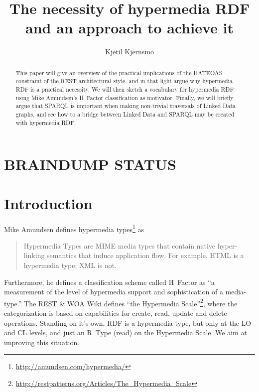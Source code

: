\documentclass{llncs}
\title{The necessity of hypermedia RDF and an approach to achieve it}
\author{Kjetil Kjernsmo\inst{1}}
\institute{Department of Informatics,
Postboks 1080 Blindern,
0316 Oslo, Norway
\email{kjekje@ifi.uio.no}}
\begin{document}
\maketitle



\begin{abstract}
This paper will give an overview of the practical implications of the
HATEOAS constraint of the REST architectural style, and in that light argue why
hypermedia RDF is a practical necessity. We will then sketch a
vocabulary for hypermedia RDF using Mike Amundsen's H~Factor
classification as motivator. Finally, we will briefly argue that
SPARQL is important when making non-trivial traversals of Linked Data
graphs, and see how to a bridge between Linked Data and SPARQL may be
created with hypermedia RDF.
\end{abstract}

\section*{BRAINDUMP STATUS}

\section{Introduction}


Mike Amundsen defines hypermedia types\footnote{\url{http://amundsen.com/hypermedia/}} as 
\begin{quote}
Hypermedia Types are MIME media types that contain native
hyper-linking semantics that induce application flow. For example,
HTML is a hypermedia type; XML is not.
\end{quote}
Furthermore, he defines a classification scheme called H~Factor as ``a
measurement of the level of hypermedia support and sophistication of a
media-type.'' The REST & WOA Wiki defines ``the Hypermedia
Scale''\footnote{\url{http://restpatterns.org/Articles/The_Hypermedia_Scale}},
where the categorization is based on capabilities for create, read,
update and delete operations.  Standing on it's own, RDF is a
hypermedia type, but only at the \textsf{LO} and \textsf{CL} levels,
and just an R~Type (read) on the Hypermedia Scale. We aim at improving
this situation.
\end{document}
